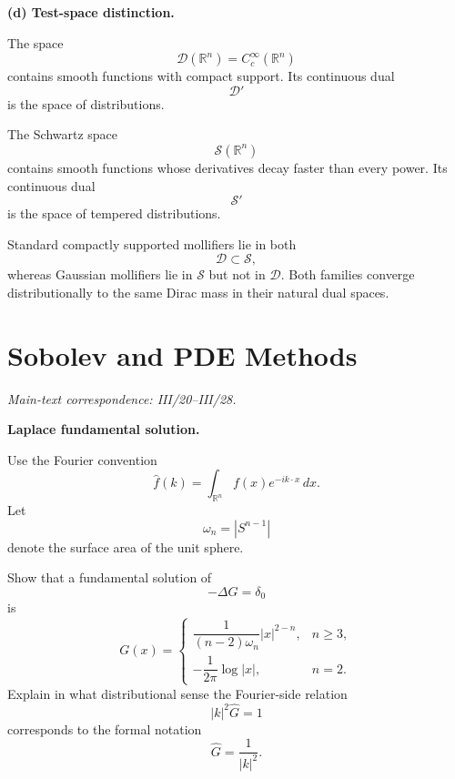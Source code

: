 \begin{solution}
\par\smallskip\noindent\textbf{(d) Test-space distinction.}

The space
\[
\mathcal D(\mathbb R^n)=C_c^\infty(\mathbb R^n)
\]
contains smooth functions with compact support. Its continuous dual
\[
\mathcal D'
\]
is the space of distributions.

The Schwartz space
\[
\mathcal S(\mathbb R^n)
\]
contains smooth functions whose derivatives decay faster than every
power. Its continuous dual
\[
\mathcal S'
\]
is the space of tempered distributions.

Standard compactly supported mollifiers lie in both
\[
\mathcal D\subset\mathcal S,
\]
whereas Gaussian mollifiers lie in \(\mathcal S\) but not in
\(\mathcal D\). Both families converge distributionally to the same
Dirac mass in their natural dual spaces.
\end{solution}


\section{Sobolev and PDE Methods}
\noindent\textit{Main-text correspondence: III/20--III/28.}

\begin{problem}[CP-III-0009]
\label{prob:cp-iii-0009}
\textbf{Laplace fundamental solution.}

Use the Fourier convention
\[
\widehat f(k)
=
\int_{\mathbb R^n}
f(x)e^{-ik\cdot x}\,dx.
\]
Let
\[
\omega_n
=
|S^{n-1}|
\]
denote the surface area of the unit sphere.

Show that a fundamental solution of
\[
-\Delta G=\delta_0
\]
is
\[
G(x)
=
\begin{cases}
\dfrac1{(n-2)\omega_n}|x|^{2-n},
&n\ge3,\\[3mm]
-\dfrac1{2\pi}\log|x|,
&n=2.
\end{cases}
\]
Explain in what distributional sense the Fourier-side relation
\[
|k|^2\widehat G=1
\]
corresponds to the formal notation
\[
\widehat G=\frac1{|k|^2}.
\]
\end{problem}

